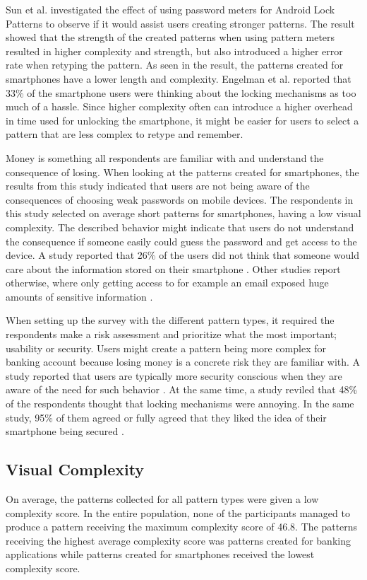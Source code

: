       Sun et al. \cite{Sun} investigated the effect of using password meters for Android Lock Patterns to observe if it would assist users creating stronger patterns. The result showed that the strength of the created patterns when using pattern meters resulted in higher complexity and strength, but also introduced a higher error rate when retyping the pattern. As seen in the result, the patterns created for smartphones have a lower length and complexity. Engelman et al. \cite{Egelman} reported that 33\% of the smartphone users were thinking about the locking mechanisms as too much of a hassle. Since higher complexity often can introduce a higher overhead in time used for unlocking the smartphone, it might be easier for users to select a pattern that are less complex to retype and remember.   

      Money is something all respondents are familiar with and understand the consequence of losing. When looking at the patterns created for smartphones, the results from this study indicated that users are not being aware of the consequences of choosing weak passwords on mobile devices. The respondents in this study selected on average short patterns for smartphones, having a low visual complexity. The described behavior might indicate that users do not understand the consequence if someone easily could guess the password and get access to the device. A study reported that 26\% of the users did not think that someone would care about the information stored on their smartphone \cite{Egelman}. Other studies report otherwise, where only getting access to for example an email exposed huge amounts of sensitive information \cite{Egelman}. 

      When setting up the survey with the different pattern types, it required the respondents make a risk assessment and prioritize what the most important; usability or security. Users might create a pattern being more complex for banking account because losing money is a concrete risk they are familiar with. A study reported that users are typically more security conscious when they are aware of the need for such behavior \cite{Sasse}. At the same time, a study reviled that 48\% of the respondents thought that locking mechanisms were annoying. In the same study, 95\% of them agreed or fully agreed that they liked the idea of their smartphone being secured \cite{habits3}.

    \subsection{Visual Complexity}
      On average, the patterns collected for all pattern types were given a low complexity score. In the entire population, none of the participants managed to produce a pattern receiving the maximum complexity score of 46.8. The patterns receiving the highest average complexity score was patterns created for banking applications while patterns created for smartphones received the lowest complexity score. 

